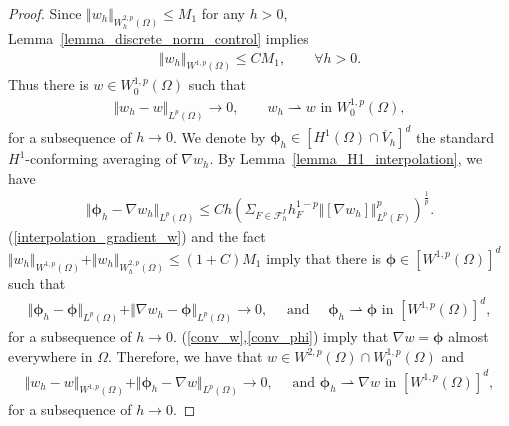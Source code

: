 \documentclass[12pt]{amsart}
\theoremstyle{definition}
\theoremstyle{remark}
\begin{document}
\begin{proof}
Since $\Vert  w_{h} \Vert_{W_{h}^{2,p}(\Omega)} \leq M_{1}$ for any $h>0$, 
Lemma~\ref{lemma_discrete_norm_control} implies 
\begin{align*}
\Vert w_{h}\Vert_{W^{1,p}(\Omega)} \leq C M_{1}, \qquad \forall h>0.
\end{align*}
Thus there is $w \in W_{0}^{1,p}(\Omega)$ such that 
\begin{align}
\label{conv_w}
\Vert w_{h} - w\Vert_{L^{p}(\Omega)} \rightarrow 0, \qquad 
w_{h} \rightharpoonup w \text{ in } W_{0}^{1,p}(\Omega),
\end{align}
for a subsequence of $h \rightarrow 0$.
We denote by $\boldsymbol{\phi}_{h} \in [H^{1}(\Omega)\cap \overline{V}_{h}]^{d}$ the standard $H^{1}$-conforming 
averaging of $\nabla w_{h}$. By Lemma~\ref{lemma_H1_interpolation}, we have  
\begin{align}
\label{interpolation_gradient_w}
\Vert \boldsymbol{\phi}_{h} - \nabla w_{h} \Vert_{L^{p}(\Omega)} 
\leq C h \left( \Sigma_{F \in \mathcal{F}_{h}^{I}} h_{F}^{1-p}\Vert [\nabla w_{h}] \Vert_{L^{p}(F)}^{p} \right)^{\frac{1}{p}}.
\end{align}
(\ref{interpolation_gradient_w}) and the fact $ \Vert w_{h}\Vert_{W^{1,p}(\Omega)} + \Vert w_{h} \Vert_{W_{h}^{2,p}(\Omega)} 
\leq (1+C)M_{1}$ imply that there is $\boldsymbol{\phi} \in [W^{1,p}(\Omega)]^{d}$ such that 
\begin{align}
\label{conv_phi}
\Vert \boldsymbol{\phi}_{h} - \boldsymbol{\phi}\Vert_{L^{p}(\Omega)} 
+ \Vert \nabla w_{h} - \boldsymbol{\phi} \Vert_{L^{p}(\Omega)} \rightarrow 0, 
\quad \text{ and } \quad \boldsymbol{\phi}_{h} \rightharpoonup \boldsymbol{\phi} \text{ in } [W^{1,p}(\Omega)]^{d},
\end{align}
for a subsequence of $h \rightarrow 0$.
(\ref{conv_w},\ref{conv_phi}) imply that $\nabla w = \boldsymbol{\phi}$ almost everywhere in $\Omega$. Therefore, we have that 
$w \in W^{2,p}(\Omega) \cap W_{0}^{1,p}(\Omega)$ and 
\begin{align}
\label{conv_w_second_order}
\Vert w_{h} - w \Vert_{W^{1,p}(\Omega)} + \Vert \boldsymbol{\phi}_{h} - \nabla w \Vert_{L^{p}(\Omega)} \rightarrow 0, 
\quad \text{ and } \boldsymbol{\phi}_{h} \rightharpoonup \nabla w \text{ in } [W^{1,p}(\Omega)]^{d},
\end{align}
for a subsequence of $h \rightarrow 0$.


\end{proof}
\end{document}
